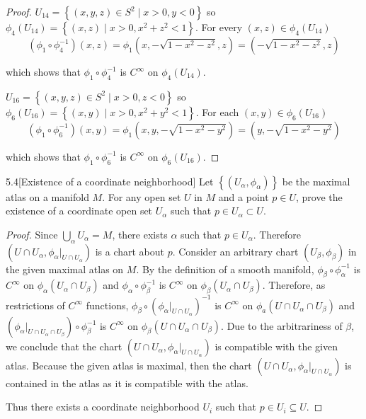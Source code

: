 \begin{proof}
    \( U_{14} = \left\{ (x, y, z) \in S^{2} \mid x > 0, y < 0 \right\} \) so \( \phi_{4}(U_{14}) = \left\{ (x, z) \mid x > 0, x^{2} + z^{2} < 1 \right\} \). For every \( (x, z) \in \phi_{4}(U_{14}) \)
    \[
        (\phi_{1}\circ \phi_{4}^{-1})(x, z) = \phi_{1}(x, -\sqrt{1 - x^{2} - z^{2}}, z) = (-\sqrt{1 - x^{2} - z^{2}}, z)
    \]

    which shows that \( \phi_{1} \circ \phi_{4}^{-1} \) is \( C^{\infty} \) on \( \phi_{4}(U_{14}) \).

    \( U_{16} = \left\{ (x, y, z) \in S^{2} \mid x > 0, z < 0 \right\} \) so \( \phi_{6}(U_{16}) = \left\{ (x, y) \mid x > 0, x^{2} + y^{2} < 1 \right\} \). For each \( (x, y) \in \phi_{6}(U_{16}) \)
    \[
        (\phi_{1}\circ \phi_{6}^{-1})(x, y) = \phi_{1}(x, y, -\sqrt{1 - x^{2} - y^{2}}) = (y, -\sqrt{1 - x^{2} - y^{2}})
    \]

    which shows that \( \phi_{1}\circ \phi_{6}^{-1} \) is \( C^{\infty} \) on \( \phi_{6}(U_{16}) \).
\end{proof}

\begin{problem}{5.4}[Existence of a coordinate neighborhood]
Let \( \left\{ (U_{\alpha}, \phi_{\alpha}) \right\} \) be the maximal atlas on a manifold \( M \). For any open set \( U \) in \( M \) and a point \( p \in U \), prove the existence of a coordinate open set \( U_{\alpha} \) such that \( p \in U_{\alpha} \subset U \).
\end{problem}

\begin{proof}
    Since \( \bigcup_{\alpha} U_{\alpha} = M \), there exists \( \alpha \) such that \( p \in U_{\alpha} \). Therefore \( (U \cap U_{\alpha}, \phi_{\alpha}\vert_{U \cap U_{\alpha}}) \) is a chart about \( p \). Consider an arbitrary chart \( (U_{\beta}, \phi_{\beta}) \) in the given maximal atlas on \( M \). By the definition of a smooth manifold, \( \phi_{\beta} \circ \phi_{\alpha}^{-1} \) is \( C^{\infty} \) on \( \phi_{\alpha}(U_{\alpha} \cap U_{\beta}) \) and \( \phi_{\alpha} \circ \phi_{\beta}^{-1} \) is \( C^{\infty} \) on \( \phi_{\beta}(U_{\alpha}\cap U_{\beta}) \). Therefore, as restrictions of \( C^{\infty} \) functions, \( \phi_{\beta} \circ {(\phi_{\alpha}\vert_{U\cap U_{\alpha}})}^{-1} \) is \( C^{\infty} \) on \( \phi_{a}(U \cap U_{\alpha} \cap U_{\beta}) \) and \( {(\phi_{\alpha}\vert_{U\cap U_{\alpha} \cap U_{\beta}})} \circ \phi_{\beta}^{-1} \) is \( C^{\infty} \) on \( \phi_{\beta}(U \cap U_{\alpha} \cap U_{\beta}) \). Due to the arbitrariness of \( \beta \), we conclude that the chart \( (U \cap U_{\alpha}, \phi_{\alpha}\vert_{U\cap U_{\alpha}}) \) is compatible with the given atlas. Because the given atlas is maximal, then the chart \( (U \cap U_{\alpha}, \phi_{\alpha}\vert_{U \cap U_{\alpha}}) \) is contained in the atlas as it is compatible with the atlas.

    Thus there exists a coordinate neighborhood \( U_{i} \) such that \( p \in U_{i} \subseteq U \).
\end{proof}

